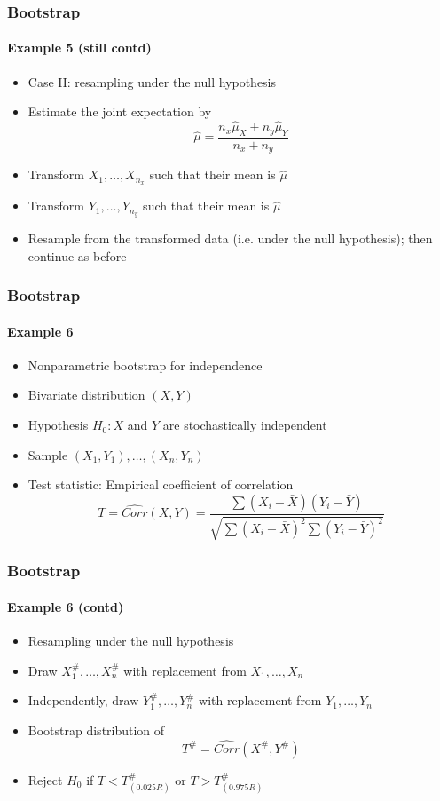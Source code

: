 \documentclass[smaller,compress]{beamer}
\begin{document}
\begin{frame}\frametitle{Bootstrap}\framesubtitle{Example 5 (still contd)}
\begin{itemize}
    \item Case II: resampling under the null hypothesis\hspace*{\fill}{\tiny bootex5b.R}
    \item Estimate the joint expectation by
    \begin{equation*}
    \hat{\mu}=\frac{n_x\hat{\mu}_{X}+n_y\hat{\mu}_{Y}}{n_x+n_y}
    \end{equation*}
    \item Transform $X_{1},\ldots ,X_{n_x}$ such that their mean is $\hat{\mu}$
    \item Transform $Y_{1},\ldots ,Y_{n_y}$ such that their mean is $\hat{\mu}$
    \item Resample from the transformed data (i.e. under the null hypothesis);
    then continue as before
\end{itemize}
\end{frame}


\begin{frame}\frametitle{Bootstrap}\framesubtitle{Example 6}
\begin{itemize}
    \item Nonparametric bootstrap for independence
    \item Bivariate distribution $\left( X,Y\right) $
    \item Hypothesis $H_{0}:X$ and $Y$ are stochastically independent
    \item Sample $\left( X_{1},Y_{1}\right) ,\ldots ,\left( X_{n},Y_{n}\right) $
    \item Test statistic: Empirical coefficient of correlation
    \begin{equation*}
    T=\widehat{Corr}(X,Y)=\frac{\sum \left( X_{i}-\bar{X}\right) \left( Y_{i}-\bar{Y}\right) }{\sqrt{\sum \left( X_{i}-\bar{X}\right) ^{2}\sum \left(Y_{i}-\bar{Y}\right) ^{2}}}
    \end{equation*}
\end{itemize}
\end{frame}


\begin{frame}\frametitle{Bootstrap}\framesubtitle{Example 6 (contd)}
\begin{itemize}
    \item Resampling under the null hypothesis\hspace*{\fill}{\tiny bootex6.R}
    \item Draw $X_{1}^{\#},\ldots ,X_{n}^{\#}$ with replacement from $X_{1},\ldots ,X_{n}$
    \item Independently, draw $Y_{1}^{\#},\ldots ,Y_{n}^{\#}$ with replacement from $Y_{1},\ldots ,Y_{n}$
    \item Bootstrap distribution of
    \begin{equation*}
    T^{\#}=\widehat{Corr}(X^{\#},Y^{\#})
    \end{equation*}
    \item Reject $H_{0}$ if $T<T_{(0.025R)}^{\#}$ or $T>T_{(0.975R)}^{\#}$
\end{itemize}
\end{frame}
\end{document}
